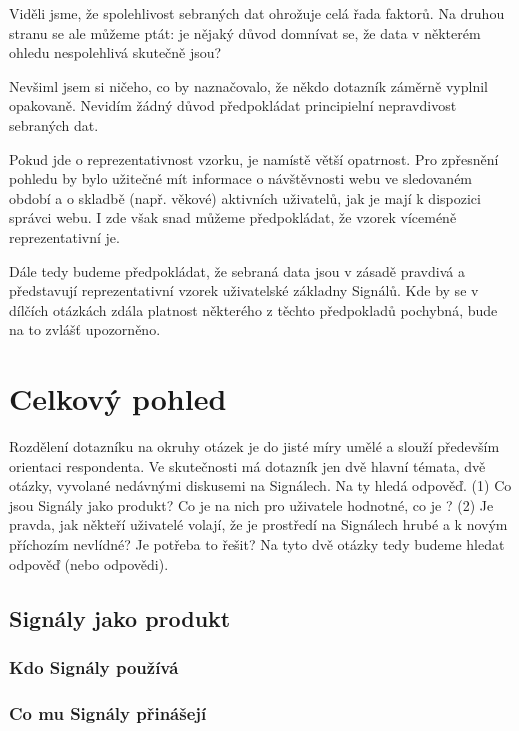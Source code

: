 \documentclass[12pt, a4paper, twoside]{article}
\begin{document}
Viděli jsme, že spolehlivost sebraných dat ohrožuje celá řada
faktorů. Na druhou stranu se ale můžeme ptát:
je nějaký důvod domnívat se, že data v některém ohledu nespolehlivá
skutečně jsou?

Nevšiml jsem si ničeho, co by naznačovalo, že někdo dotazník
záměrně vyplnil opakovaně. Nevidím žádný důvod předpokládat
principielní nepravdivost sebraných dat.

Pokud jde o reprezentativnost vzorku, je namístě větší opatrnost.
Pro zpřesnění pohledu by bylo užitečné mít informace
o návštěvnosti webu ve sledovaném období a o skladbě (např. věkové)
aktivních uživatelů, jak je mají k dispozici správci webu.
I zde však snad můžeme předpokládat, že vzorek víceméně
reprezentativní je.

Dále tedy budeme předpokládat, že sebraná data jsou v zásadě
pravdivá a představují reprezentativní vzorek uživatelské základny
Signálů. Kde by se v dílčích otázkách zdála platnost některého
z těchto předpokladů pochybná, bude na to zvlášť upozorněno.

\section{Celkový pohled}

Rozdělení dotazníku na okruhy otázek je do jisté míry umělé
a slouží především orientaci respondenta.
Ve skutečnosti má dotazník jen dvě hlavní témata,
dvě otázky, vyvolané nedávnými diskusemi na Signálech.
Na ty hledá odpověď. (1) Co jsou Signály jako produkt?
Co je na nich pro uživatele hodnotné, co je ?
(2) Je pravda, jak někteří uživatelé volají, že je prostředí
na Signálech hrubé a k novým příchozím nevlídné?
Je potřeba to řešit?
Na tyto dvě otázky tedy budeme hledat odpověď (nebo odpovědi).

\subsection{Signály jako produkt}

\subsubsection{Kdo Signály používá}

\subsubsection{Co mu Signály přinášejí}

\subsection{}
\end{document}
